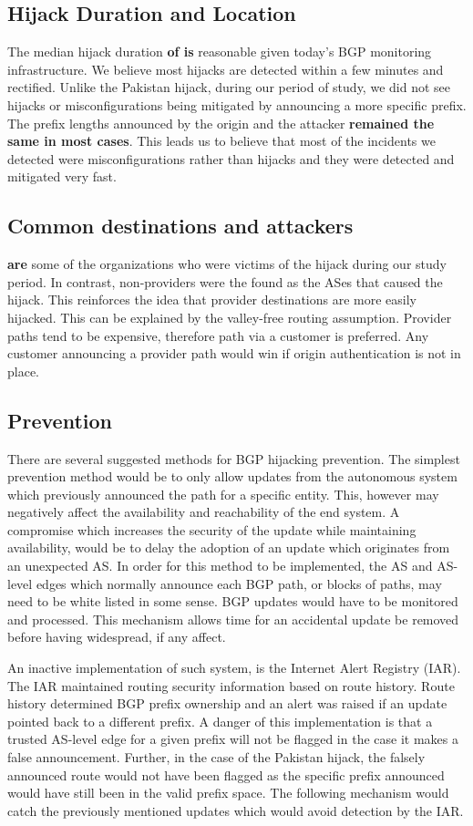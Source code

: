 \subsection{Hijack Duration  and Location}
The median hijack duration\textbf{ of is} reasonable given today's BGP monitoring infrastructure. We believe most hijacks are detected within a few minutes and rectified. Unlike the Pakistan hijack, during our period of study, we did not see hijacks or misconfigurations being mitigated by announcing a more specific prefix. The prefix lengths announced by the origin and the attacker \textbf{remained the same in most cases}. This leads us to believe that most of the incidents we detected were misconfigurations rather than hijacks and they were detected and mitigated very fast.
\subsection{Common destinations and attackers}
\textbf{are} some of the organizations who were victims of the hijack during our study period. In contrast, non-providers were the found as the ASes that caused the hijack. This reinforces the idea that provider destinations are more easily hijacked. This can be explained by the valley-free routing assumption. Provider paths tend to be expensive, therefore path via a customer is preferred. Any customer announcing a provider path would win if origin authentication is not in place.
\subsection{Prevention}
 There are several suggested methods for BGP hijacking prevention. The simplest prevention method would be to only allow updates from the autonomous system which previously announced the path for a specific entity. This, however may negatively affect the availability and reachability of the end system. A compromise which increases the security of the update while maintaining availability, would be to delay the adoption of an update which originates from an unexpected AS. In order for this method to be implemented, the AS and AS-level edges which normally announce each BGP path, or blocks of paths, may need to be white listed in some sense. BGP updates would have to be monitored and processed. This mechanism allows time for an accidental update be removed before having widespread, if any affect. 
 
An inactive implementation of such system, is the Internet Alert Registry (IAR). The IAR  maintained routing security information based on route history. Route history determined BGP prefix ownership and an alert was raised if an update pointed back to a different prefix. A danger of this implementation is that a trusted AS-level edge for a given prefix will not be flagged in the case it makes a false announcement. Further, in the case of the Pakistan hijack, the falsely announced route would not have been flagged as the specific prefix announced would have still been in the valid prefix space. The following mechanism would catch the previously mentioned updates which would avoid detection by the IAR.

